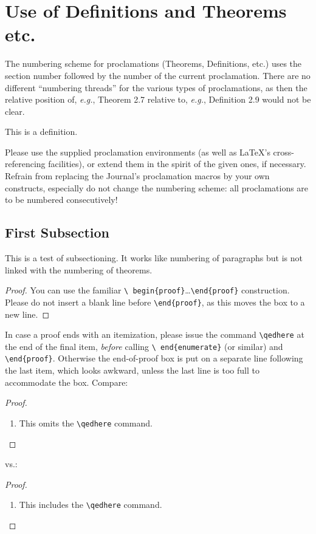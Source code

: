 \documentclass{jpc} %
\theoremstyle{plain}\newtheorem{satz}[thm]{Satz} %
\def\eg{{\em e.g.}}
\begin{document}
\section{Use of  Definitions and Theorems etc.}

  The numbering scheme for proclamations (Theorems, Definitions, etc.)
  uses the section number followed by the number of the current
  proclamation.  There are no different ``numbering threads'' for the
  various types of proclamations, as then the relative position of,
  \eg, Theorem 2.7 relative to, \eg, Definition 2.9 would not be clear.

\begin{defi}\label{D:first}
  This is a definition.
\end{defi}

  Please use the supplied proclamation environments (as well as
  LaTeX's cross-referencing facilities), or extend them in the spirit
  of the given ones, if necessary.
  Refrain from replacing the Journal's proclamation macros by your own
  constructs, especially do not change the numbering scheme: all
  proclamations are to be numbered consecutively!

\subsection{First Subsection}

  This is a test of subsectioning.  It works like numbering of
  paragraphs but is not linked with the numbering of theorems.


\begin{proof} You can use the familiar \texttt{\textbackslash
    begin\{proof\}}\dots\texttt{\textbackslash end\{proof\}}
  construction.  Please do not insert a blank line before
  \texttt{\textbackslash end\{proof\}}, as this moves the box to a new
  line.
\end{proof}

  In case a proof ends with an itemization,
  please issue the command \texttt{\textbackslash qedhere} at the end
  of the final item, \emph{before} calling \texttt{\textbackslash
    end\{enumerate\}} (or similar) and \texttt{\textbackslash end\{proof\}}.
  Otherwise the end-of-proof box is put on a separate line
  following the last item, which looks awkward, unless the last line
  is too full to accommodate the box. Compare:
\begin{proof}
  \begin{enumerate}
  	\item This omits the \texttt{\textbackslash qedhere} command.
  \end{enumerate}
\end{proof}
vs.:
\begin{proof}
	\begin{enumerate}
		\item This includes the \texttt{\textbackslash qedhere} command. \qedhere
	\end{enumerate}
\end{proof}
\end{document}

